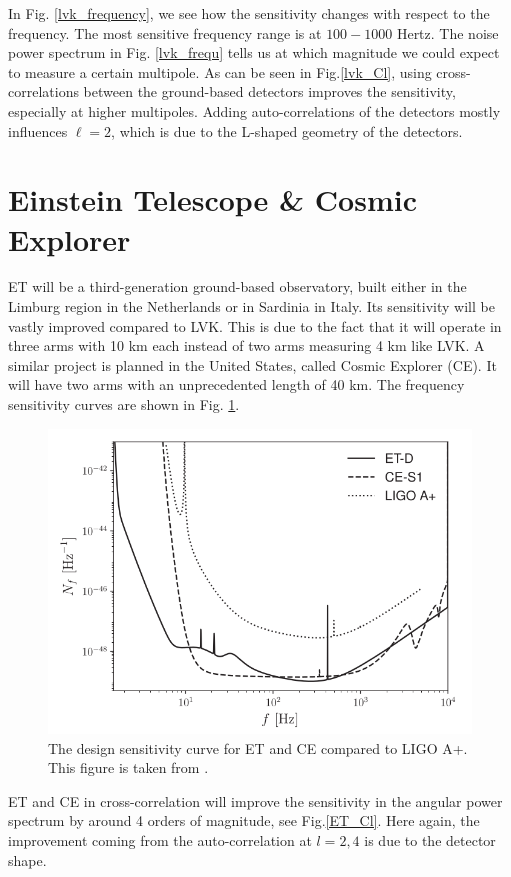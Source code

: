 In Fig. \ref{lvk_frequency}, we see how the sensitivity changes with respect to the frequency. The most sensitive frequency range is at $100 -1000$ Hertz.
The noise power spectrum in Fig. \ref{lvk_frequ} tells us at which magnitude we could expect to measure a certain multipole.
As can be seen in Fig.\ref{lvk_Cl}, using cross-correlations between the ground-based detectors improves the sensitivity, especially at higher multipoles. Adding auto-correlations of the detectors mostly influences $\ell=2$, which is due to the L-shaped geometry of the detectors. 

\section{Einstein Telescope \& Cosmic Explorer}

\label{ET_CE}

ET will be a third-generation ground-based observatory, built either in the Limburg region in the Netherlands or in Sardinia in Italy. Its sensitivity will be vastly improved compared to LVK. This is due to the fact that it will operate in three arms with 10 km each instead of two arms measuring 4 km like LVK. A similar project is planned in the United States, called Cosmic Explorer (CE). It will have two arms with an unprecedented length of 40 km. The frequency sensitivity curves are shown in Fig. \ref{ET_sensitivity}.

\begin{figure}[h]
    \centering
    \includegraphics[width=0.7\linewidth]{Images/ET_CE_frequency_noise.png}
    \caption[The design sensitivity curve for ET and CE compared to LIGO A+.]{The design sensitivity curve for ET and CE compared to LIGO A+. This figure is taken from \cite{alonso_noise_2020}.}
    \label{ET_sensitivity}
\end{figure} 

ET and CE in cross-correlation will improve the sensitivity in the angular power spectrum by around 4 orders of magnitude, see Fig.\ref{ET_Cl}.  Here again, the improvement coming from the auto-correlation at $l=2, 4$ is due to the detector shape.

